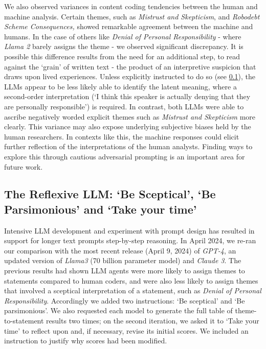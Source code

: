 \documentclass{article}
\begin{document}
We also observed variances in content coding tendencies between the human and machine analysis. Certain themes, such as \emph{Mistrust and Skepticism}, and \emph{Robodebt Scheme Consequences,} showed remarkable agreement between the machine and humans. In the case of others like \emph{Denial of Personal Responsibility} - where \emph{Llama 2} barely assigns the theme - we observed significant discrepancy. It is possible this difference results from the need for an additional step, to read against the `grain' of written text - the product of an interpretive suspicion that draws upon lived experiences. Unless explicitly instructed to do so (see \ref{gpt-4-revisited}), the LLMs appear to be less likely able to identify the latent meaning, where a second-order interpretation (`I think this speaker is actually denying that they are personally responsible') is required. In contrast, both LLMs were able to ascribe negatively worded explicit themes such as \emph{Mistrust and Skepticism} more clearly. This variance may also expose underlying subjective biases held by the human researchers. In contexts like this, the machine responses could elicit further reflection of the interpretations of the human analysts. Finding ways to explore this through cautious adversarial prompting is an important area for future work.


\subsection{The Reflexive LLM: `Be Sceptical', `Be Parsimonious' and `Take your time'}\label{gpt-4-revisited}


Intensive LLM development and experiment with prompt design has resulted in support for longer text prompts step-by-step reasoning. In April 2024, we re-ran our comparison with the most recent release (April 9, 2024) of \emph{GPT-4}, an updated version of \emph{Llama3} (70 billion parameter model) and \emph{Claude 3}. The previous results had shown LLM agents were more likely to assign themes to statements compared to human coders, and were also less likely to assign themes that involved a sceptical interpretation of a statement, such as \emph{Denial of Personal Responsibility}. Accordingly we added two instructions: `Be sceptical' and `Be parsimonious'. We also requested each model to generate the full table of theme-to-statement results two times; on the second iteration, we asked it to `Take your time' to reflect upon and, if necessary, revise its initial scores. We included an instruction to justify why scores had been modified.
\end{document}

